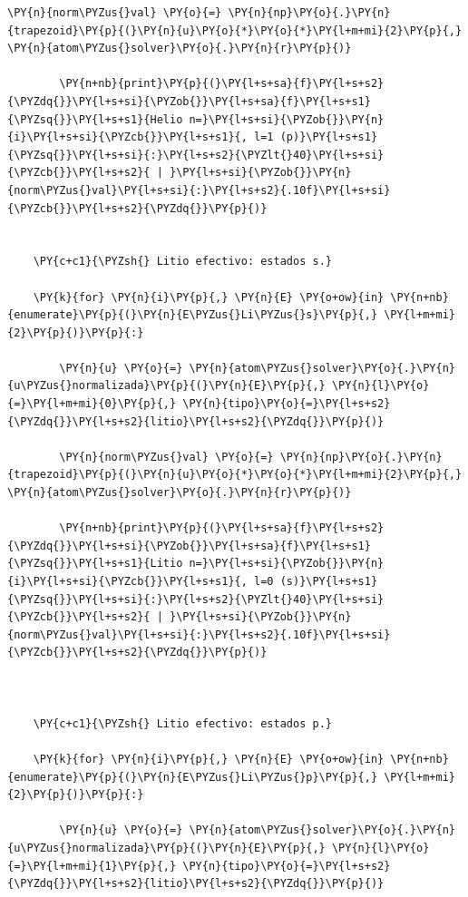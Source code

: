 \documentclass[11pt]{article}
\makeatletter
\def\PY@reset{\let\PY@it=\relax \let\PY@bf=\relax \let\PY@ul=\relax \let\PY@tc=\relax \let\PY@bc=\relax \let\PY@ff=\relax}
\def\PY@tok#1{\csname PY@tok@#1\endcsname}
\def\PY@toks#1+{\ifx\relax#1\empty\else \PY@tok{#1}\expandafter\PY@toks\fi}
\def\PY@do#1{\PY@bc{\PY@tc{\PY@ul{\PY@it{\PY@bf{\PY@ff{#1}}}}}}}
\def\PY#1#2{\PY@reset\PY@toks#1+\relax+\PY@do{#2}}
\makeatother
\begin{document}
\begin{tcolorbox}[breakable, size=fbox, boxrule=1pt, pad at break*=1mm,colback=cellbackground, colframe=cellborder]
\begin{Verbatim}[commandchars=\\\{\}]
        \PY{n}{norm\PYZus{}val} \PY{o}{=} \PY{n}{np}\PY{o}{.}\PY{n}{trapezoid}\PY{p}{(}\PY{n}{u}\PY{o}{*}\PY{o}{*}\PY{l+m+mi}{2}\PY{p}{,} \PY{n}{atom\PYZus{}solver}\PY{o}{.}\PY{n}{r}\PY{p}{)}

        \PY{n+nb}{print}\PY{p}{(}\PY{l+s+sa}{f}\PY{l+s+s2}{\PYZdq{}}\PY{l+s+si}{\PYZob{}}\PY{l+s+sa}{f}\PY{l+s+s1}{\PYZsq{}}\PY{l+s+s1}{Helio n=}\PY{l+s+si}{\PYZob{}}\PY{n}{i}\PY{l+s+si}{\PYZcb{}}\PY{l+s+s1}{, l=1 (p)}\PY{l+s+s1}{\PYZsq{}}\PY{l+s+si}{:}\PY{l+s+s2}{\PYZlt{}40}\PY{l+s+si}{\PYZcb{}}\PY{l+s+s2}{ | }\PY{l+s+si}{\PYZob{}}\PY{n}{norm\PYZus{}val}\PY{l+s+si}{:}\PY{l+s+s2}{.10f}\PY{l+s+si}{\PYZcb{}}\PY{l+s+s2}{\PYZdq{}}\PY{p}{)}


    \PY{c+c1}{\PYZsh{} Litio efectivo: estados s.}

    \PY{k}{for} \PY{n}{i}\PY{p}{,} \PY{n}{E} \PY{o+ow}{in} \PY{n+nb}{enumerate}\PY{p}{(}\PY{n}{E\PYZus{}Li\PYZus{}s}\PY{p}{,} \PY{l+m+mi}{2}\PY{p}{)}\PY{p}{:}

        \PY{n}{u} \PY{o}{=} \PY{n}{atom\PYZus{}solver}\PY{o}{.}\PY{n}{u\PYZus{}normalizada}\PY{p}{(}\PY{n}{E}\PY{p}{,} \PY{n}{l}\PY{o}{=}\PY{l+m+mi}{0}\PY{p}{,} \PY{n}{tipo}\PY{o}{=}\PY{l+s+s2}{\PYZdq{}}\PY{l+s+s2}{litio}\PY{l+s+s2}{\PYZdq{}}\PY{p}{)}

        \PY{n}{norm\PYZus{}val} \PY{o}{=} \PY{n}{np}\PY{o}{.}\PY{n}{trapezoid}\PY{p}{(}\PY{n}{u}\PY{o}{*}\PY{o}{*}\PY{l+m+mi}{2}\PY{p}{,} \PY{n}{atom\PYZus{}solver}\PY{o}{.}\PY{n}{r}\PY{p}{)}

        \PY{n+nb}{print}\PY{p}{(}\PY{l+s+sa}{f}\PY{l+s+s2}{\PYZdq{}}\PY{l+s+si}{\PYZob{}}\PY{l+s+sa}{f}\PY{l+s+s1}{\PYZsq{}}\PY{l+s+s1}{Litio n=}\PY{l+s+si}{\PYZob{}}\PY{n}{i}\PY{l+s+si}{\PYZcb{}}\PY{l+s+s1}{, l=0 (s)}\PY{l+s+s1}{\PYZsq{}}\PY{l+s+si}{:}\PY{l+s+s2}{\PYZlt{}40}\PY{l+s+si}{\PYZcb{}}\PY{l+s+s2}{ | }\PY{l+s+si}{\PYZob{}}\PY{n}{norm\PYZus{}val}\PY{l+s+si}{:}\PY{l+s+s2}{.10f}\PY{l+s+si}{\PYZcb{}}\PY{l+s+s2}{\PYZdq{}}\PY{p}{)}

        

    \PY{c+c1}{\PYZsh{} Litio efectivo: estados p.}

    \PY{k}{for} \PY{n}{i}\PY{p}{,} \PY{n}{E} \PY{o+ow}{in} \PY{n+nb}{enumerate}\PY{p}{(}\PY{n}{E\PYZus{}Li\PYZus{}p}\PY{p}{,} \PY{l+m+mi}{2}\PY{p}{)}\PY{p}{:}

        \PY{n}{u} \PY{o}{=} \PY{n}{atom\PYZus{}solver}\PY{o}{.}\PY{n}{u\PYZus{}normalizada}\PY{p}{(}\PY{n}{E}\PY{p}{,} \PY{n}{l}\PY{o}{=}\PY{l+m+mi}{1}\PY{p}{,} \PY{n}{tipo}\PY{o}{=}\PY{l+s+s2}{\PYZdq{}}\PY{l+s+s2}{litio}\PY{l+s+s2}{\PYZdq{}}\PY{p}{)}


\end{Verbatim}
\end{tcolorbox}
\end{document}
